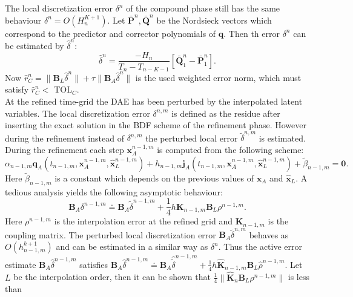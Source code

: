 \documentclass{report}
\begin{document}
The local discretization error $\delta^n$ of the compound phase still has
the same behaviour $\delta^n = O(H_n^{K+1})$.
Let $\bar{\mathbf{P}}^n,\bar{\mathbf{Q}}^n$ be the Nordsieck vectors
which correspond to the predictor and corrector polynomials of $\mathbf{q}$.
Then th error $\delta^n$ can be estimated by $\hat{\delta}^n$:
\begin{equation}
\hat{\delta}^n = \frac{-H_n}{T_n - T_{n-K-1}} \left
[\bar{\mathbf{Q}}_{1}^{n}-\bar{\mathbf{P}}_{1}^{n} \right ].
\end{equation}
Now $\hat r_C^n = \|\mathbf{B}_L \hat{\delta}^n\| + \tau\|\mathbf{B}_A
\hat{\delta}^n\| $ is the used weighted error norm, which must satisfy
$\hat r_C^n <$ TOL$_C$.\\
At the refined time-grid the DAE has been perturbed by
the interpolated latent variables. The local discretization error $\delta^{n,m}$
is defined as the residue after inserting the exact solution
in the BDF scheme of the refinement phase.
However during the refinement instead of $\delta^{n,m}$ the perturbed
local error $\tilde{\delta}^{n,m}$ is estimated.
During the refinement each step $\mathbf{x}_A^{n-1,m}$ is computed from
the following scheme:
\begin{equation}\alpha_{n-1,m}
\mathbf{q}_A(t_{n-1,m},\mathbf{x}_A^{n-1,m},\hat{\mathbf{x}}_L^{n-1,m}) +
h_{n-1,m}
\mathbf{j}_A(t_{n-1,m},\mathbf{x}_A^{n-1,m},\hat{\mathbf{x}}_L^{n-1,m}) +
\tilde\beta_{n-1,m} = \mathbf{0}.\end{equation}
Here $\tilde\beta_{n-1,m}$ is a constant which depends
on the previous values of $\mathbf{x}_A$ and $\hat{\mathbf{x}}_L$.
A tedious analysis yields the following asymptotic behaviour:
\begin{equation}\label{deltarelation}
\mathbf{B}_A\delta^{n-1,m} \doteq
\mathbf{B}_A\tilde{\delta}^{n-1,m} + \frac{1}{4}h
\mathbf{K}_{n-1,m}\mathbf{B}_L\rho^{n-1,m}.
\end{equation}
Here $\rho^{n-1,m}$ is the interpolation error at the refined grid and
$\mathbf{K}_{n-1,m}$ is
the coupling matrix.
The perturbed local discretization error $\mathbf{B}_A\tilde{\delta}^{n,m}$ behaves as
$O(h_{n-1,m}^{k+1})$ and
can be estimated
in a similar way as $\delta^n$.
Thus the active error estimate $\mathbf{B}_A\hat\delta^{n-1,m}$
satisfies $\mathbf{B}_A\hat\delta^{n-1,m} \doteq
\mathbf{B}_A\hat{\tilde{\delta}}^{n-1,m} + \frac{1}{4}h
\hat{\mathbf{K}}_{n-1,m}\mathbf{B}_L\hat\rho^{n-1,m}$.
Let $L$ be the interpolation order, then it can be shown that
$\frac{1}{4}\|\hat{\mathbf{K}}_{n}\mathbf{B}_L\rho^{n-1,m}\|$ is less than
\end{document}
